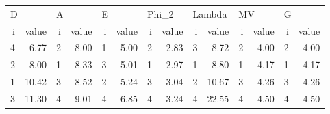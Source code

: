\begin{tabular}{rrrrrrrrrrrrrr}
\toprule
 \multicolumn{2}{l}{D} & \multicolumn{2}{l}{A} & \multicolumn{2}{l}{E} & \multicolumn{2}{l}{Phi\_2} & \multicolumn{2}{l}{Lambda} & \multicolumn{2}{l}{MV} & \multicolumn{2}{l}{G} \\
 i &  value &  i & value &  i & value &     i & value &      i &  value &  i & value &  i & value \\
\midrule
 4 &   6.77 &  2 &  8.00 &  1 &  5.00 &     2 &  2.83 &      3 &   8.72 &  2 &  4.00 &  2 &  4.00 \\
 2 &   8.00 &  1 &  8.33 &  3 &  5.01 &     1 &  2.97 &      1 &   8.80 &  1 &  4.17 &  1 &  4.17 \\
 1 &  10.42 &  3 &  8.52 &  2 &  5.24 &     3 &  3.04 &      2 &  10.67 &  3 &  4.26 &  3 &  4.26 \\
 3 &  11.30 &  4 &  9.01 &  4 &  6.85 &     4 &  3.24 &      4 &  22.55 &  4 &  4.50 &  4 &  4.50 \\
\bottomrule
\end{tabular}
